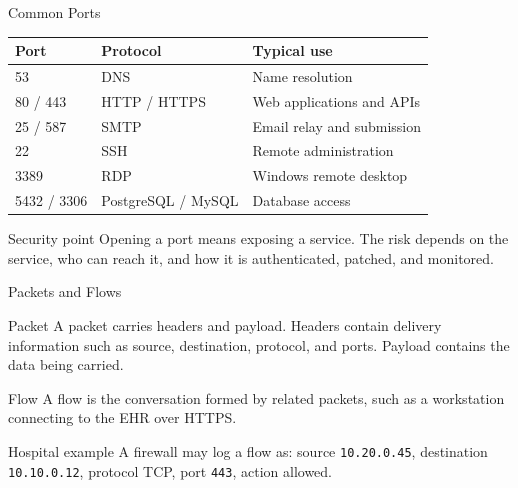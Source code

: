 \documentclass[presentation]{beamer}
\begin{document}
\begin{frame}[c]{Common Ports}
\small
\begin{tabularx}{\textwidth}{@{}p{}p{}X@{}}
\toprule
\textbf{Port} & \textbf{Protocol} & \textbf{Typical use} \\
\midrule
53 & DNS & Name resolution \\
80 / 443 & HTTP / HTTPS & Web applications and APIs \\
25 / 587 & SMTP & Email relay and submission \\
22 & SSH & Remote administration \\
3389 & RDP & Windows remote desktop \\
5432 / 3306 & PostgreSQL / MySQL & Database access \\
\bottomrule
\end{tabularx}

\begin{block}{Security point}
Opening a port means exposing a service. The risk depends on the service, who can reach it, and how
it is authenticated, patched, and monitored.
\end{block}
\end{frame}

\begin{frame}[c]{Packets and Flows}
\begin{block}{Packet}
A packet carries headers and payload. Headers contain delivery information such as source,
destination, protocol, and ports. Payload contains the data being carried.
\end{block}

\begin{block}{Flow}
A flow is the conversation formed by related packets, such as a workstation connecting to the EHR
over HTTPS.
\end{block}

\begin{exampleblock}{Hospital example}
A firewall may log a flow as: source \texttt{10.20.0.45}, destination \texttt{10.10.0.12}, protocol
TCP, port \texttt{443}, action allowed.
\end{exampleblock}
\end{frame}
\end{document}
